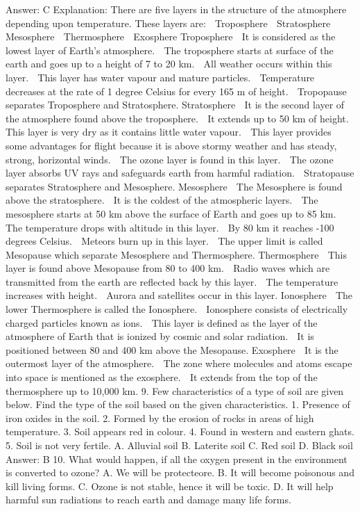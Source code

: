 Answer: C
Explanation: There are five layers in the structure of the atmosphere depending upon temperature. These layers are:  Troposphere  Stratosphere  Mesosphere  Thermosphere  Exosphere Troposphere  It is considered as the lowest layer of Earth’s atmosphere.  The troposphere starts at surface of the earth and goes up to a height of 7 to 20 km.  All weather occurs within this layer.  This layer has water vapour and mature particles.  Temperature decreases at the rate of 1 degree Celsius for every 165 m of height.  Tropopause separates Troposphere and Stratosphere. Stratosphere  It is the second layer of the atmosphere found above the troposphere.  It extends up to 50 km of height.  This layer is very dry as it contains little water vapour.  This layer provides some advantages for flight because it is above stormy weather and has steady, strong, horizontal winds.  The ozone layer is found in this layer.  The ozone layer absorbs UV rays and safeguards earth from harmful radiation.  Stratopause separates Stratosphere and Mesosphere. Mesosphere  The Mesosphere is found above the stratosphere.  It is the coldest of the atmospheric layers.  The mesosphere starts at 50 km above the surface of Earth and goes up to 85 km.  The temperature drops with altitude in this layer.  By 80 km it reaches -100 degrees Celsius.  Meteors burn up in this layer.  The upper limit is called Mesopause which separate Mesosphere and Thermosphere. Thermosphere  This layer is found above Mesopause from 80 to 400 km.  Radio waves which are transmitted from the earth are reflected back by this layer.  The temperature increases with height.  Aurora and satellites occur in this layer. Ionosphere  The lower Thermosphere is called the Ionosphere.  Ionosphere consists of electrically charged particles known as ions.  This layer is defined as the layer of the atmosphere of Earth that is ionized by cosmic and solar radiation.  It is positioned between 80 and 400 km above the Mesopause. Exosphere  It is the outermost layer of the atmosphere.  The zone where molecules and atoms escape into space is mentioned as the exosphere.  It extends from the top of the thermosphere up to 10,000 km. 9. Few characteristics of a type of soil are given below. Find the type of the soil based on the given characteristics. 1. Presence of iron oxides in the soil. 2. Formed by the erosion of rocks in areas of high temperature. 3. Soil appears red in colour. 4. Found in western and eastern ghats. 5. Soil is not very fertile. A. Alluvial soil B. Laterite soil C. Red soil D. Black soil 
Answer: B 10. What would happen, if all the oxygen present in the environment is converted to ozone? A. We will 
be protecteore. B. It will become poisonous and kill living forms. C. Ozone is not stable, hence it will be toxic. D. It will help harmful sun radiations to reach earth and damage many life forms. 

